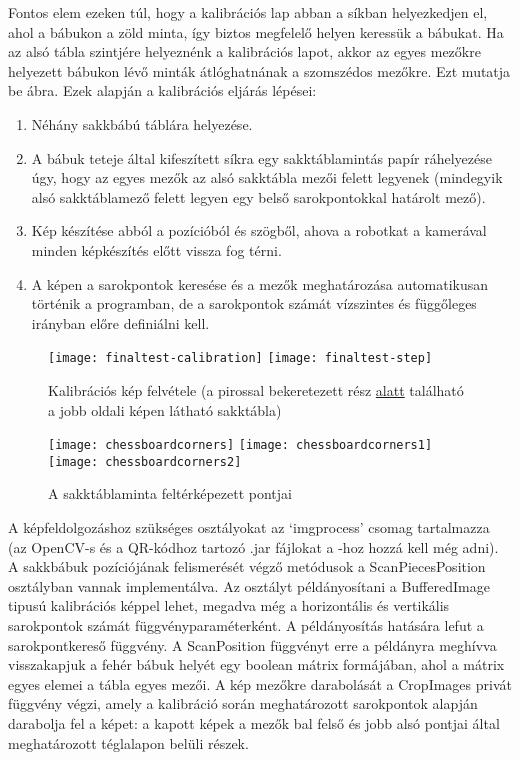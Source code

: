 \documentclass[../documentation.tex]{subfiles}
\begin{document}
Fontos elem ezeken túl, hogy a kalibrációs lap abban a síkban helyezkedjen el, ahol a bábukon a zöld minta, így biztos megfelelő helyen keressük a bábukat. Ha az alsó tábla szintjére helyeznénk a kalibrációs lapot, akkor az egyes mezőkre helyezett bábukon lévő minták átlóghatnának a szomszédos mezőkre. Ezt mutatja be  ábra.
Ezek alapján a kalibrációs eljárás lépései:

\begin{enumerate}
	\item Néhány sakkbábú táblára helyezése.
	\item A bábuk teteje által kifeszített síkra egy sakktáblamintás papír ráhelyezése úgy, hogy az egyes mezők az alsó sakktábla mezői felett legyenek (mindegyik alsó sakktáblamező felett legyen egy belső sarokpontokkal határolt mező).
	\item Kép készítése abból a pozícióból és szögből, ahova a robotkat a kamerával minden képkészítés előtt vissza fog térni.
	\item A képen a sarokpontok keresése és a mezők meghatározása automatikusan történik a programban, de a sarokpontok számát vízszintes és függőleges irányban előre definiálni kell.
\end{enumerate}

\begin{figure}[h]
\centering
\texttt{[image: finaltest-calibration]}
\texttt{[image: finaltest-step]}
\caption{Kalibrációs kép felvétele (a pirossal bekeretezett rész \underline{alatt} található a jobb oldali képen látható sakktábla)}
\label{fig:chessboardcalibration}
\end{figure}

\begin{figure}[h]
\centering
\texttt{[image: chessboardcorners]}
\texttt{[image: chessboardcorners1]}
\texttt{[image: chessboardcorners2]}
\caption{A sakktáblaminta feltérképezett pontjai}
\label{fig:chessboardcorners}
\end{figure}

A képfeldolgozáshoz szükséges osztályokat az `imgprocess' csomag tartalmazza (az OpenCV-s és a QR-kódhoz tartozó .jar fájlokat a -hoz hozzá kell még adni). A sakkbábuk pozíciójának felismerését végző metódusok a ScanPiecesPosition osztályban vannak implementálva. Az osztályt példányosítani a BufferedImage tipusú kalibrációs képpel lehet, megadva még a horizontális és vertikális sarokpontok számát függvényparaméterként. A példányosítás hatására lefut a sarokpontkereső függvény. A ScanPosition függvényt erre a példányra meghívva visszakapjuk a fehér bábuk helyét egy boolean mátrix formájában, ahol a mátrix egyes elemei a tábla egyes mezői. A kép mezőkre darabolását a CropImages privát függvény végzi, amely a kalibráció során meghatározott sarokpontok alapján darabolja fel a képet: a kapott képek a mezők bal felső és jobb alsó pontjai által meghatározott téglalapon belüli részek.
\end{document}
